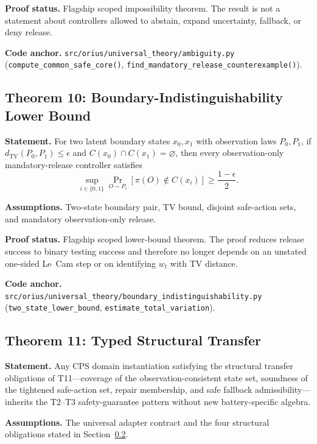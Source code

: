 \textbf{Proof status.} Flagship scoped impossibility theorem.  The result is
not a statement about controllers allowed to abstain, expand uncertainty,
fallback, or deny release.

\textbf{Code anchor.} \texttt{src/orius/universal\_theory/ambiguity.py}
(\texttt{compute\_common\_safe\_core()},
\texttt{find\_mandatory\_release\_counterexample()}).

\subsection{Theorem 10: Boundary-Indistinguishability Lower Bound}
\label{sec:thm-info-lower-bound}

\textbf{Statement.} For two latent boundary states \(x_0,x_1\) with observation
laws \(P_0,P_1\), if \(d_{\mathrm{TV}}(P_0,P_1)\le\epsilon\) and
\(C(x_0)\cap C(x_1)=\varnothing\), then every observation-only mandatory-release
controller satisfies
\[
  \sup_{i\in\{0,1\}}\Pr_{O\sim P_i}[\pi(O)\notin C(x_i)]
  \ge \frac{1-\epsilon}{2}.
\]

\textbf{Assumptions.} Two-state boundary pair, TV bound, disjoint safe-action
sets, and mandatory observation-only release.

\textbf{Proof status.} Flagship scoped lower-bound theorem.  The proof reduces
release success to binary testing success and therefore no longer depends on an
unstated one-sided Le~Cam step or on identifying \(w_t\) with TV distance.

\textbf{Code anchor.} \texttt{src/orius/universal\_theory/boundary\_indistinguishability.py}
(\texttt{two\_state\_lower\_bound}, \texttt{estimate\_total\_variation}).

\subsection{Theorem 11: Typed Structural Transfer}
\label{sec:thm-universality-completeness}

\textbf{Statement.} Any CPS domain instantiation satisfying the structural
transfer obligations of T11---coverage of the observation-consistent state
set, soundness of the tightened safe-action set, repair membership, and
safe fallback admissibility---inherits the T2--T3 safety-guarantee pattern
without new battery-specific algebra.

\textbf{Assumptions.} The universal adapter contract and the four structural
obligations stated in Section~\ref{sec:thm-universality-completeness}.

